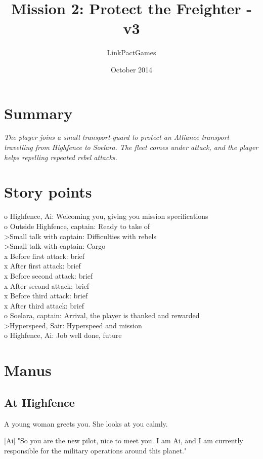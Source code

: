 \documentclass[a4paper,12pt]{article}
\begin{document}
\title{Mission 2: Protect the Freighter - v3}
\author{LinkPactGames}
\date{October 2014}
\maketitle

\section{Summary}
\textit{The player joins a small transport-guard to protect an Alliance
transport travelling from Highfence to Soelara. The fleet comes under attack,
and the player helps repelling repeated rebel attacks.}

\section{Story points}
o Highfence, Ai: Welcoming you, giving you mission specifications\\
o Outside Highfence, captain: Ready to take of\\
\textgreater Small talk with captain: Difficulties with rebels\\
\textgreater Small talk with captain: Cargo\\
x Before first attack: brief\\
x After first attack: brief\\
x Before second attack: brief\\
x After second attack: brief\\
x Before third attack: brief\\
x After third attack: brief\\
o Soelara, captain: Arrival, the player is thanked and rewarded\\
\textgreater Hyperspeed, Sair: Hyperspeed and mission\\
o Highfence, Ai: Job well done, future

\section{Manus}

\subsection{At Highfence}

A young woman greets you. She looks at you calmly. 

[Ai] "So you are the new pilot, nice to meet you. I am Ai, and I am currently
responsible for the military operations around this planet."
\end{document}
